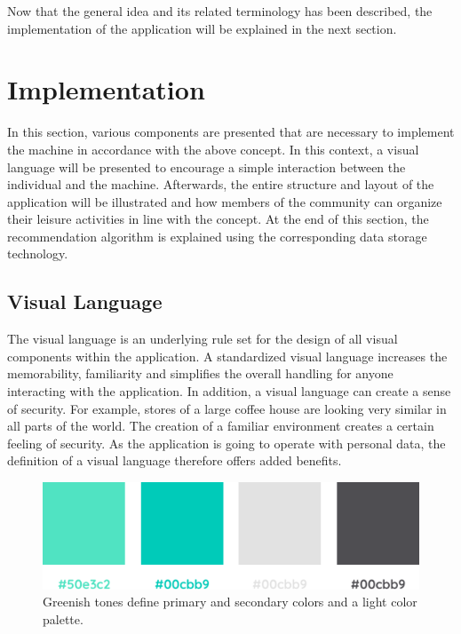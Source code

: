 \documentclass[12pt,numbers=noenddot,parskip,bibliography=totocnumbered,listof=totocnumbered,draft]{scrreprt}
\begin{document}
Now that the general idea and its related terminology has been described, the implementation of the application will be explained in the next section.

\section{Implementation}
In this section, various components are presented that are necessary to implement the machine in accordance with the above concept. In this context, a visual language will be presented to encourage a simple interaction between the individual and the machine. Afterwards, the entire structure and layout of the application will be illustrated and how members of the community can organize their leisure activities in line with the concept. At the end of this section, the recommendation algorithm is explained using the corresponding data storage technology.

\subsection{Visual Language} 
The visual language is an underlying rule set for the design of all visual components within the application. A standardized visual language increases the memorability, familiarity and simplifies the overall handling for anyone interacting with the application. In addition, a visual language can create a sense of security. For example, stores of a large coffee house are looking very similar in all parts of the world. The creation of a familiar environment creates a certain feeling of security. As the application is going to operate with personal data, the definition of a visual language therefore offers added benefits.

\begin{figure}
\centering
\includegraphics[width=\textwidth]{colors.png}
\caption[Color palette]{Greenish tones define primary and secondary colors and a light color palette.}
\label{colors}
\end{figure}
\end{document}
